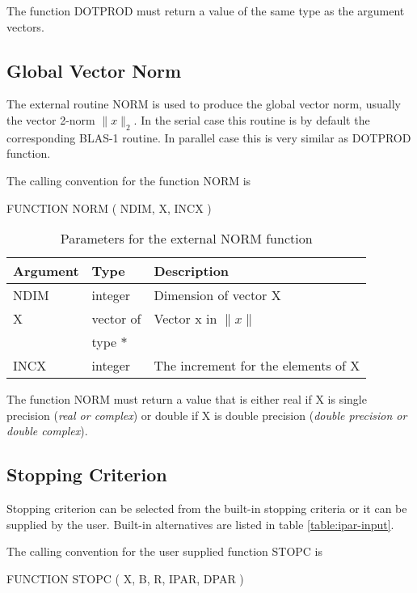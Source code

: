 \documentclass[11pt,a4paper,english,oneside]{report}
\begin{document}
The function {\ttfamily DOTPROD} must return a value of the same type as the
argument vectors.

\subsection{Global Vector Norm}

The external routine {\ttfamily NORM} is used to produce the global
vector norm, usually the vector 2-norm $\|x\|_{2}$. In the serial case
this routine is by default the corresponding BLAS-1 routine. In parallel
case this is very similar as {\ttfamily DOTPROD} function.

The calling convention for the function {\ttfamily NORM} is

\bigskip
\noindent
{\ttfamily FUNCTION NORM ( NDIM, X, INCX )}
\bigskip

\begin{table}[H]
\begin{tabular*}{\textwidth}{lll}
\hline\hline
{\bfseries Argument} & {\bfseries Type} & {\bfseries Description} \\
\hline
NDIM	& integer		& Dimension of vector X \\
X	& vector of 		& Vector x in $\|x\|$ \\
	& type $*$		& \\
INCX	& integer		& The increment for the elements of X \\
\hline\hline
\end{tabular*}
\caption{Parameters for the external NORM function}
\label{table:norm-param}
\end{table}

The function {\ttfamily NORM} must return a value that is either
real if X is single precision ({\em real or complex}) or double if X is
double precision ({\em double precision or double complex}).

\subsection{Stopping Criterion}

Stopping criterion can be selected from the built-in stopping criteria
or it can be supplied by the user. Built-in alternatives are
listed in table \ref{table:ipar-input}.

The calling convention for the user supplied function {\ttfamily STOPC} is

\bigskip
\noindent
{\ttfamily FUNCTION STOPC ( X, B, R, IPAR, DPAR )}
\bigskip
\end{document}
